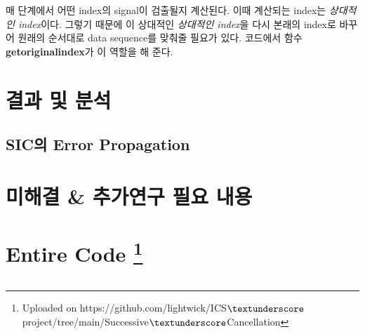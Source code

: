 \documentclass{article}
\newcommand{\bd}{\textbf} %
\begin{document}
매 단계에서 어떤 index의 signal이 검출될지 계산된다. 이때 계산되는 index는 \textsl{상대적인 index}이다. 그렇기 때문에 이 상대적인 \textsl{상대적인 index}을 다시 본래의 index로  바꾸어 원래의 순서대로 data sequence를 맞춰줄 필요가 있다. 코드에서 함수 \bd{get\textunderscore original\textunderscore index}가 이 역할을 해 준다.
\section{결과 및 분석}
\subsection{SIC의 Error Propagation}
\section{미해결 \& 추가연구 필요 내용}
\section[Entire Code]{Entire Code \footnote{Uploaded on https://github.com/lightwick/ICS$\textunderscore $project/tree/main/Successive$\textunderscore $Cancellation}}
\begin{lstlisting}[style=Matlab-editor, frame=single, numbers=left,]
\end{lstlisting}
\end{document}
